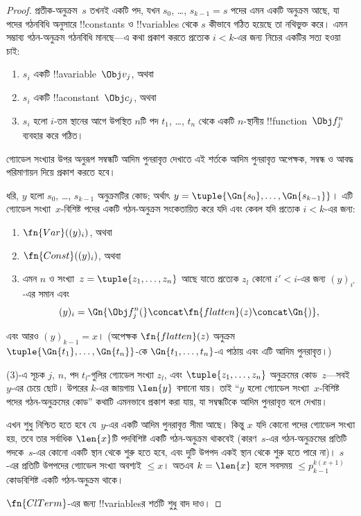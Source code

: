 \documentclass[../../../include/open-logic-section]{subfiles}
\begin{document}
\begin{proof}
প্রতীক-অনুক্রম~$s$ তখনই একটি পদ, যখন $s_0$, \dots, $s_{k-1} = s$ পদের এমন
একটি অনুক্রম আছে, যা পদের গঠনবিধি অনুসারে !!{constant}s ও !!{variable}s থেকে
$s$ কীভাবে গঠিত হয়েছে তা নথিভুক্ত করে। এমন সম্ভাব্য গঠন-অনুক্রম গঠনবিধি
মানছে—এ কথা প্রকাশ করতে প্রত্যেক $i < k$-এর জন্য নিচের একটির সত্য হওয়া চাই:
\begin{enumerate}
\item $s_i$ একটি !!a{variable}~$\Obj v_j$, অথবা
\item $s_i$ একটি !!a{constant}~$\Obj c_j$, অথবা
\item $s_i$ হলো $i$-তম স্থানের আগে উপস্থিত $n$টি পদ $t_1$, \dots, $t_n$
  থেকে একটি $n$-স্থানীয় !!{function}~$\Obj f^n_j$ ব্যবহার করে গঠিত।
\end{enumerate}
গ্যোডেল সংখ্যার উপর অনুরূপ সম্বন্ধটি আদিম পুনরাবৃত্ত দেখাতে এই শর্তকে আদিম
পুনরাবৃত্ত অপেক্ষক, সম্বন্ধ ও আবদ্ধ পরিমাণায়ন দিয়ে প্রকাশ করতে হবে।

ধরি, $y$ হলো $s_0$, \dots, $s_{k-1}$ অনুক্রমটির কোড; অর্থাৎ
$y = \tuple{\Gn{s_0}, \dots, \Gn{s_{k-1}}}$। এটি গ্যোডেল সংখ্যা~$x$-বিশিষ্ট
পদের একটি গঠন-অনুক্রম সংকেতায়িত করে যদি এবং কেবল যদি প্রত্যেক $i < k$-এর
জন্য:
\begin{enumerate}
\item $\fn{Var}((y)_i)$, অথবা
\item $\fn{Const}((y)_i)$, অথবা
\item এমন $n$ ও সংখ্যা~$z = \tuple{z_1, \dots, z_n}$ আছে যাতে প্রত্যেক
  $z_l$ কোনো $i' < i$-এর জন্য $(y)_{i'}$-এর সমান এবং
\[
(y)_i = \Gn{\Obj f^n_j(} \concat \fn{flatten}(z) \concat \Gn{)},
\]
\end{enumerate}
এবং আরও $(y)_{k-1} = x$। (অপেক্ষক $\fn{flatten}(z)$ অনুক্রম
$\tuple{\Gn{t_1}, \dots, \Gn{t_n}}$-কে $\Gn{t_1, \dots, t_n}$-এ পাঠায়
এবং এটি আদিম পুনরাবৃত্ত।)

(3)-এ সূচক $j$, $n$, পদ $t_l$-গুলির গ্যোডেল সংখ্যা $z_l$, এবং
$\tuple{z_1, \dots, z_n}$ অনুক্রমের কোড~$z$—সবই~$y$-এর চেয়ে ছোট। উপরের
$k$-এর জায়গায় $\len{y}$ বসানো যায়। তাই ``$y$ হলো গ্যোডেল সংখ্যা~$x$-বিশিষ্ট
পদের গঠন-অনুক্রমের কোড'' কথাটি এমনভাবে প্রকাশ করা যায়, যা সম্বন্ধটিকে আদিম
পুনরাবৃত্ত বলে দেখায়।

এখন শুধু নিশ্চিত হতে হবে যে~$y$-এর একটি আদিম পুনরাবৃত্ত সীমা আছে। কিন্তু
$x$ যদি কোনো পদের গ্যোডেল সংখ্যা হয়, তবে তার সর্বাধিক $\len{x}$টি পদবিশিষ্ট
একটি গঠন-অনুক্রম থাকবেই (কারণ~$s$-এর গঠন-অনুক্রমের প্রতিটি পদকে~$s$-এর কোনো
একটি স্থান থেকে শুরু হতে হবে, এবং দুটি উপপদ একই স্থান থেকে শুরু হতে পারে না)।
$s$-এর প্রতিটি উপপদের গ্যোডেল সংখ্যা অবশ্যই $\le x$। অতএব
$k=\len{x}$ হলে সবসময় $\le p_{k-1}^{k(x+1)}$ কোডবিশিষ্ট একটি গঠন-অনুক্রম
থাকে।

$\fn{ClTerm}$-এর জন্য !!{variable}sর শর্তটি শুধু বাদ দাও।
\end{proof}
\end{document}
